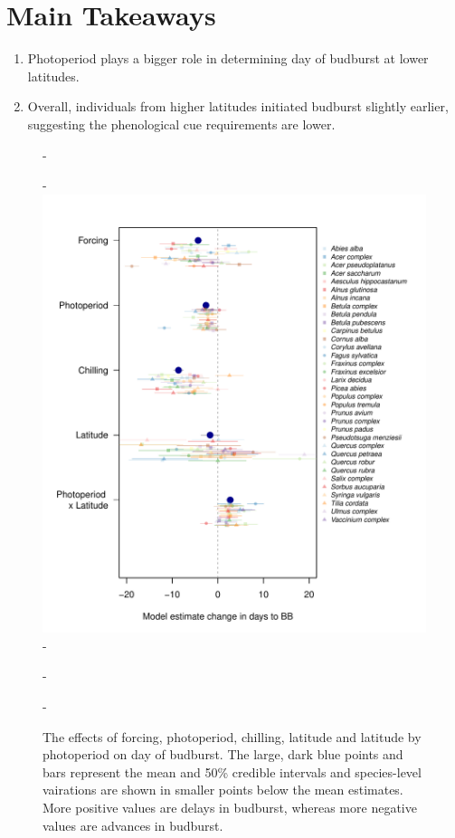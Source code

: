 \documentclass{article}\usepackage[]{graphicx}\usepackage[]{color}
\begin{document}
\section*{Main Takeaways}
\begin{enumerate}
\item Photoperiod plays a bigger role in determining day of budburst at lower latitudes.
\item Overall, individuals from higher latitudes initiated budburst slightly earlier, suggesting the phenological cue requirements are lower. 
\end{enumerate}




{\begin{figure} [H]
  -\begin{center}
  -\includegraphics[width=14cm]{..//figures/spcom_expramp_fp.pdf}
  -\caption{The effects of forcing, photoperiod, chilling, latitude and latitude by photoperiod on day of budburst. The large, dark blue points and bars represent the mean and 50\% credible intervals and species-level vairations are shown in smaller points below the mean estimates. More positive values are delays in budburst, whereas more negative values are advances in budburst.  }\label{fig:modelest}
  -\end{center}
  -\end{figure}}
\end{document}
